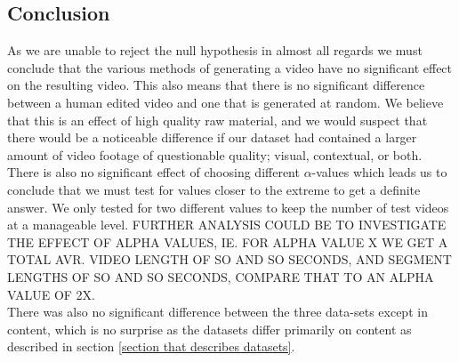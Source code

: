 \subsection{Conclusion}
%
As we are unable to reject the null hypothesis in almost all regards we must conclude that the various methods of generating a video have no significant effect on the resulting video. This also means that there is no significant difference between a human edited video and one that is generated at random. We believe that this is an effect of high quality raw material, and we would suspect that there would be a noticeable difference if our dataset had contained a larger amount of video footage of questionable quality; visual, contextual, or both.\\
There is also no significant effect of choosing different $\alpha$-values which leads us to conclude that we must test for values closer to the extreme to get a definite answer. We only tested for two different values to keep the number of test videos at a manageable level. FURTHER ANALYSIS COULD BE TO INVESTIGATE THE EFFECT OF ALPHA VALUES, IE. FOR ALPHA VALUE X WE GET A TOTAL AVR. VIDEO LENGTH OF SO AND SO SECONDS, AND SEGMENT LENGTHS OF SO AND SO SECONDS, COMPARE THAT TO AN ALPHA VALUE OF 2X.\\
There was also no significant difference between the three data-sets except in content, which is no surprise as the datasets differ primarily on content as described in section \ref{section that describes datasets}.
%